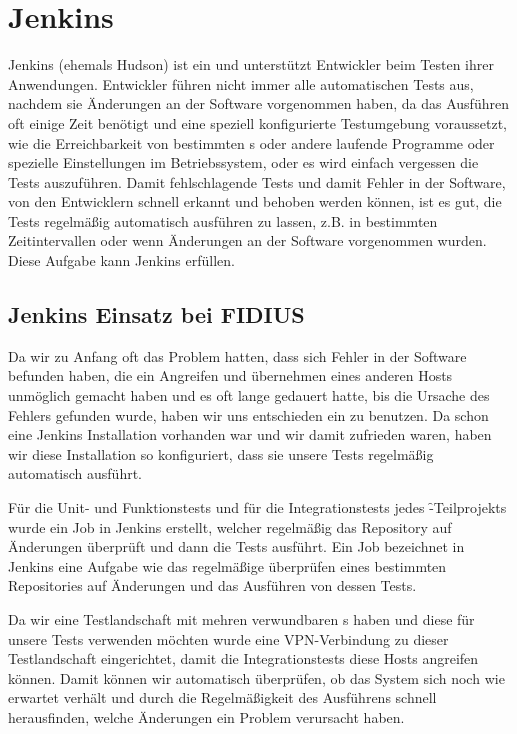 \section{Jenkins}
\label{sec:test_jenkins}
\authors{\HM}{\BK \and \LM \and \MW \and \JF}
Jenkins (ehemals Hudson) ist ein  und unterstützt Entwickler beim
Testen ihrer Anwendungen.
Entwickler führen nicht immer alle automatischen Tests aus, nachdem sie Änderungen
an der Software vorgenommen haben, da das Ausführen oft einige Zeit benötigt und
eine speziell konfigurierte Testumgebung voraussetzt, wie die Erreichbarkeit von
bestimmten s oder andere laufende Programme oder spezielle Einstellungen
im Betriebssystem, oder es wird einfach vergessen die Tests auszuführen.
Damit fehlschlagende Tests und damit Fehler in der Software, von den Entwicklern
schnell erkannt und behoben werden können, ist es gut, die Tests regelmäßig
automatisch ausführen zu lassen, z.B.
in bestimmten Zeitintervallen oder wenn Änderungen an der Software
vorgenommen wurden.
Diese Aufgabe kann Jenkins erfüllen.

\subsection{Jenkins Einsatz bei FIDIUS}

Da wir zu Anfang oft das Problem hatten, dass sich Fehler in der Software befunden
haben, die ein Angreifen und übernehmen eines anderen Hosts unmöglich gemacht haben 
und es oft lange gedauert hatte, bis die Ursache des Fehlers gefunden
wurde, haben wir uns entschieden ein  zu benutzen.
Da schon eine Jenkins Installation vorhanden war und wir damit zufrieden waren,
haben wir diese Installation so konfiguriert, dass sie unsere Tests regelmäßig automatisch ausführt.

Für die Unit- und Funktionstests und für die Integrationstests jedes \f-Teilprojekts
wurde ein Job in Jenkins erstellt, welcher regelmäßig das Repository auf Änderungen überprüft
und dann die Tests ausführt.
Ein Job bezeichnet in Jenkins eine Aufgabe wie das regelmäßige überprüfen eines
bestimmten Repositories auf Änderungen und das Ausführen von dessen Tests.

Da wir eine Testlandschaft mit mehren verwundbaren s haben und diese
für unsere Tests verwenden möchten wurde eine VPN-Verbindung zu dieser
Testlandschaft eingerichtet, damit die Integrationstests diese
Hosts angreifen können.
Damit können wir automatisch überprüfen, ob das System sich noch wie erwartet verhält
und durch die Regelmäßigkeit des Ausführens schnell herausfinden, welche Änderungen ein
Problem verursacht haben.
